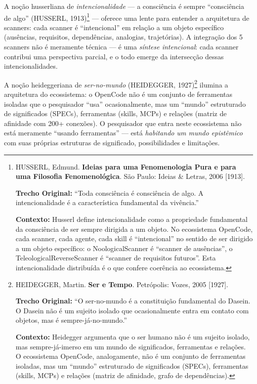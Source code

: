 A noção husserliana de \textit{intencionalidade} --- a consciência é sempre ``consciência de algo'' (HUSSERL, 1913)\footnote{
  HUSSERL, Edmund. \textbf{Ideias para uma Fenomenologia Pura e para uma Filosofia Fenomenológica}. São Paulo: Ideias \& Letras, 2006 [1913].

  \textbf{Trecho Original:} ``Toda consciência é consciência de algo. A intencionalidade é a característica fundamental da vivência.''

  \textbf{Contexto:} Husserl define intencionalidade como a propriedade fundamental da consciência de ser sempre dirigida a um objeto. No ecossistema OpenCode, cada scanner, cada agente, cada skill é ``intencional'' no sentido de ser dirigido a um objeto específico: o NoologicalScanner é ``scanner de ausências'', o TeleologicalReverseScanner é ``scanner de requisitos futuros''. Esta intencionalidade distribuída é o que confere coerência ao ecossistema.
} --- oferece uma lente para entender a arquitetura de scanners: cada scanner é ``intencional'' em relação a um objeto específico (ausências, requisitos, dependências, analogias, trajetórias). A integração dos 5 scanners não é meramente técnica --- é uma \textit{síntese intencional}: cada scanner contribui uma perspectiva parcial, e o todo emerge da intersecção dessas intencionalidades.

A noção heideggeriana de \textit{ser-no-mundo} (HEIDEGGER, 1927)\footnote{
  HEIDEGGER, Martin. \textbf{Ser e Tempo}. Petrópolis: Vozes, 2005 [1927].

  \textbf{Trecho Original:} ``O ser-no-mundo é a constituição fundamental do Dasein. O Dasein não é um sujeito isolado que ocasionalmente entra em contato com objetos, mas é sempre-já-no-mundo.''

  \textbf{Contexto:} Heidegger argumenta que o ser humano não é um sujeito isolado, mas sempre-já-imerso em um mundo de significados, ferramentas e relações. O ecossistema OpenCode, analogamente, não é um conjunto de ferramentas isoladas, mas um ``mundo'' estruturado de significados (SPECs), ferramentas (skills, MCPs) e relações (matriz de afinidade, grafo de dependências).
} ilumina a arquitetura do ecossistema: o OpenCode não é um conjunto de ferramentas isoladas que o pesquisador ``usa'' ocasionalmente, mas um ``mundo'' estruturado de significados (SPECs), ferramentas (skills, MCPs) e relações (matriz de afinidade com 200+ conexões). O pesquisador que entra neste ecossistema não está meramente ``usando ferramentas'' --- está \textit{habitando um mundo epistêmico} com suas próprias estruturas de significado, possibilidades e limitações.

